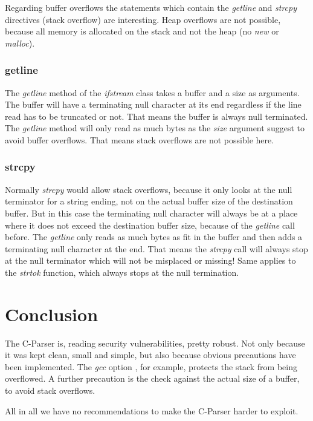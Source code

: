 Regarding buffer overflows the statements which contain the \textit{getline} and \textit{strcpy} directives (stack overflow)  are interesting. Heap overflows are not possible, because all memory is allocated on the stack and not the heap (no \textit{new} or \textit{malloc}).

\subsubsection{getline}

The \textit{getline} method of the \textit{ifstream} class takes a buffer and a size as arguments. The buffer will have a terminating null character at its end regardless if the line read has to be truncated or not. That means the buffer is always null terminated. The \textit{getline} method will only read as much bytes as the \textit{size} argument suggest to avoid buffer overflows. That means stack overflows are not possible here.

\subsubsection{strcpy}

Normally \textit{strcpy} would allow stack overflows, because it only looks at the null terminator for a string ending, not on the actual buffer size of the destination buffer. But in this case the terminating null character will always be at a place where it does not exceed the destination buffer size, because of the \textit{getline} call before. The \textit{getline} only reads as much bytes as fit in the buffer and then adds a terminating null character at the end. That means the \textit{strcpy} call will always stop at the null terminator which will not be misplaced or missing! Same applies to the \textit{strtok} function, which always stops at the null termination.

\section{Conclusion}

The C-Parser is, reading security vulnerabilities, pretty robust. Not only because it was kept clean, small and simple, but also because obvious precautions have been implemented. The \textit{gcc} option \textit{}, for example, protects the stack from being overflowed. A further precaution is the check against the actual size of a buffer, to avoid stack overflows.

All in all we have no recommendations to make the C-Parser harder to exploit.